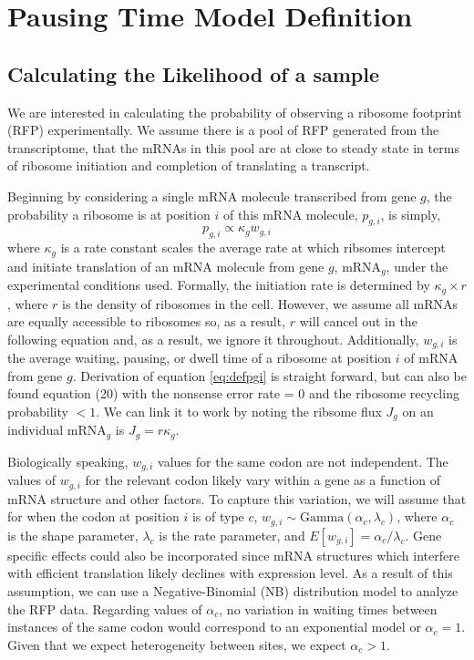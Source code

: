 \documentclass{article}
\newcommand{\elongWaitTime}{\ensuremath{w}\xspace}
\newcommand{\wgi}{\ensuremath{\elongWaitTime_{g,i}}\xspace}
\newcommand{\alphac}{\ensuremath{{\alpha_c}}\xspace}
\newcommand{\lambdac}{\ensuremath{{\lambda_c}}\xspace}
\newcommand{\pgi}{\ensuremath{{p_{g,i}}}\xspace}
\newcommand{\kappag}{\ensuremath{{\kappa_{g}}}\xspace}
\newcommand{\mRNAg}{mRNA$_g$\xspace}
\begin{document}
\section*{Pausing Time Model Definition}
\subsection*{Calculating the Likelihood of a sample}
We are interested in calculating the probability of observing a ribosome footprint (RFP) experimentally.
We assume there is a pool of RFP generated from the transcriptome, that the mRNAs in this pool are at close to steady state in terms of ribosome initiation and completion of translating a transcript.

Beginning by considering a single mRNA molecule transcribed from gene $g$, the probability a ribosome is at position $i$ of this mRNA molecule, \pgi,  is simply,
\begin{equation} \label{eq:defpgi}
\pgi  \propto \kappag \wgi
\end{equation}
where \kappag is a rate constant scales the average rate at which ribsomes intercept and initiate translation of an mRNA molecule from gene $g$, \mRNAg, under the experimental conditions used.
Formally, the initiation rate is determined by $\kappag \times r$, where  $r$ is the density of ribosomes in the cell.
However, we assume all mRNAs are equally accessible to ribosomes so, as a result, $r$ will cancel out in the following equation and, as a result, we ignore it throughout.
Additionally, \wgi is the average waiting, pausing, or dwell time of a ribosome at position $i$ of mRNA from gene $g$.  
Derivation of equation \ref{eq:defpgi} is straight forward, but can also be found \citet{GilchristAndWagner2006} equation (20) with the nonsense error rate = 0 and the ribosome recycling probability $<1$.
We can link it to \citet{PopEtAl2014} work by noting the ribsome flux $J_g$ on an individual \mRNAg is $J_g = r \kappag$.

Biologically speaking, \wgi values for the same codon are not independent.
The values of \wgi for the relevant codon likely vary within a gene as a function of mRNA structure and other factors.
To capture this variation, we will assume that for when the codon at position $i$ is of type $c$, $\wgi \sim \text{Gamma}(\alphac, \lambdac)$, where \alphac is the shape parameter, \lambdac is the rate parameter, and $E[\wgi] = \alphac/\lambdac$. %
Gene specific effects could also be incorporated since  mRNA structures which interfere with efficient translation likely declines with expression level.
As a result of this assumption, we can use a Negative-Binomial (NB) distribution model to analyze the RFP data.
Regarding values of $\alphac$, no variation in waiting times between instances of the same codon would correspond to an exponential model or $\alphac = 1$.
Given that we expect heterogeneity between sites, we expect $\alphac > 1$.
\end{document}
